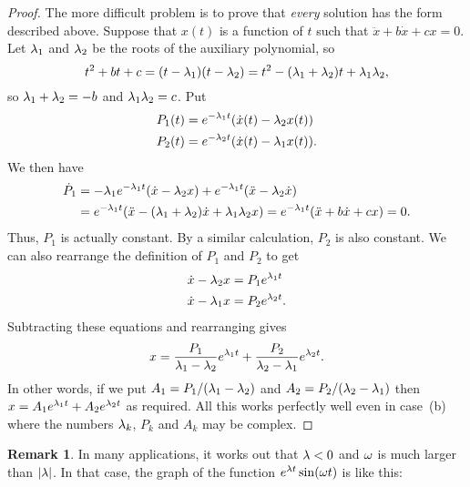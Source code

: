 \documentclass[reqno]{amsart}
\theoremstyle{definition}
\newtheorem{remark}[theorem]{Remark}
\begin{document}
\begin{proof}
 The more difficult problem is to prove that \emph{every} solution has
 the form described above.  Suppose that $x(t)$ is a function of $t$
 such that $\ddot{x}+b\dot{x}+cx=0$.  Let $\lambda_1$ and $\lambda_2$ be the
 roots of the auxiliary polynomial, so 
 \[ t^2+bt+c = (t-\lambda_1)(t-\lambda_2) = t^2-(\lambda_1+\lambda_2)t+\lambda_1\lambda_2, \]
 so $\lambda_1+\lambda_2=-b$ and $\lambda_1\lambda_2=c$.  Put
 \begin{align*}
  P_1(t) &= e^{-\lambda_1t}(\dot{x}(t) - \lambda_2 x(t)) \\
  P_2(t) &= e^{-\lambda_2t}(\dot{x}(t) - \lambda_1 x(t)).
 \end{align*}
 We then have
 \begin{align*}
  \dot{P}_1 &= 
   -\lambda_1 e^{-\lambda_1t}(\dot{x} - \lambda_2 x) + 
    e^{-\lambda_1t}(\ddot{x} - \lambda_2\dot{x}) \\
   &= e^{-\lambda_1t}(\ddot{x} - (\lambda_1+\lambda_2)\dot{x} +\lambda_1\lambda_2 x) 
    = e^{-\lambda_1t}(\ddot{x} + b\dot{x} + cx)
    = 0. 
 \end{align*}
 Thus, $P_1$ is actually constant.  By a similar calculation, $P_2$ is
 also constant.  We can also rearrange the definition of $P_1$ and
 $P_2$ to get
 \begin{align*}
  \dot{x} - \lambda_2 x &= P_1 e^{\lambda_1t} \\
  \dot{x} - \lambda_1 x &= P_2 e^{\lambda_2t}.
 \end{align*}
 Subtracting these equations and rearranging gives 
 \[ x = \frac{P_1}{\lambda_1-\lambda_2} e^{\lambda_1t} + 
        \frac{P_2}{\lambda_2-\lambda_1} e^{\lambda_2t}.
 \]
 In other words, if we put $A_1=P_1/(\lambda_1-\lambda_2)$ and
 $A_2=P_2/(\lambda_2-\lambda_1)$ then $x=A_1e^{\lambda_1t}+A_2e^{\lambda_2t}$ as
 required.  All this works perfectly well even in case~(b) where the
 numbers $\lambda_k$, $P_k$ and $A_k$ may be complex.
\end{proof}

\begin{remark}
 In many applications, it works out that $\lambda<0$ and $\omega$ is much
 larger than $|\lambda|$.  In that case, the graph of the function
 $e^{\lambda t}\sin(\omega t)$ is like this:
 \begin{center}
 \end{center}

\end{remark}
\end{document}
